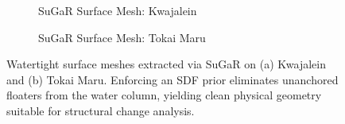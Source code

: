 \begin{figure}[htbp]
    \centering
    \begin{subfigure}[b]{0.48\textwidth}
        \centering
        \caption{SuGaR Surface Mesh: Kwajalein}
        \label{fig:sugar_kwaj_mesh}
    \end{subfigure}
    \hfill
    \begin{subfigure}[b]{0.48\textwidth}
        \centering
        \caption{SuGaR Surface Mesh: Tokai Maru}
        \label{fig:sugar_tokai_mesh}
    \end{subfigure}
    \caption{Watertight surface meshes extracted via SuGaR on (a) Kwajalein and (b) Tokai Maru. Enforcing an SDF prior eliminates unanchored floaters from the water column, yielding clean physical geometry suitable for structural change analysis.}
    \label{fig:sugar_meshes}
\end{figure}

